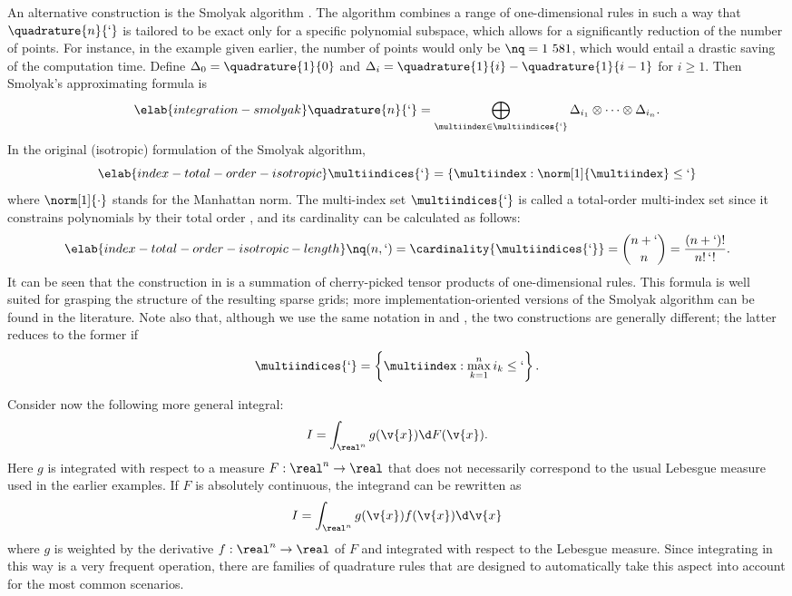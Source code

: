 An alternative construction is the Smolyak algorithm \cite{eldred2008,
heiss2008, maitre2010}. The algorithm combines a range of one-dimensional rules
in such a way that $\quadrature{n}{\lq}$ is tailored to be exact only for a
specific polynomial subspace, which allows for a significantly reduction of the
number of points. For instance, in the example given earlier, the number of
points would only be $\nq = 1~581$, which would entail a drastic saving of the
computation time. Define $\Delta_0 = \quadrature{1}{0}$ and $\Delta_i =
\quadrature{1}{i} - \quadrature{1}{i - 1}$ for $i \geq 1$. Then Smolyak's
approximating formula is
\begin{equation} \elab{integration-smolyak}
  \quadrature{n}{\lq} = \bigoplus_{\multiindex \in \multiindices{\lq}} \Delta_{i_1} \otimes \cdots \otimes \Delta_{i_n}.
\end{equation}
In the original (isotropic) formulation of the Smolyak algorithm,
\begin{equation} \elab{index-total-order-isotropic}
  \multiindices{\lq} = \left\{ \multiindex: \norm[1]{\multiindex} \leq \lq \right\}
\end{equation}
where $\norm[1]{\cdot}$ stands for the Manhattan norm. The multi-index set
$\multiindices{\lq}$ is called a total-order multi-index set since it constrains
polynomials by their total order \cite{eldred2008, beck2011}, and its
cardinality can be calculated as follows:
\begin{equation} \elab{index-total-order-isotropic-length}
  \nq(n, \lq) = \cardinality{\multiindices{\lq}} = {n + \lq \choose n} = \frac{(n + \lq)!}{n! \, \lq!}.
\end{equation}
It can be seen that the construction in  is a
summation of cherry-picked tensor products of one-dimensional rules. This
formula is well suited for grasping the structure of the resulting sparse grids;
more implementation-oriented versions of the Smolyak algorithm can be found in
the literature. Note also that, although we use the same notation in
 and , the two constructions
are generally different; the latter reduces to the former if
\[
  \multiindices{\lq} = \left\{ \multiindex: \max_{k = 1}^n i_k \leq \lq \right\}.
\]

Consider now the following more general integral:
\[
  I = \int_{\real^n} g(\v{x}) \d F(\v{x}).
\]
Here $g$ is integrated with respect to a measure $F: \real^n \to \real$
\cite{durrett2010} that does not necessarily correspond to the usual Lebesgue
measure used in the earlier examples. If $F$ is absolutely continuous, the
integrand can be rewritten as
\[
  I = \int_{\real^n} g(\v{x}) f(\v{x}) \d \v{x}
\]
where $g$ is weighted by the derivative $f: \real^n \to \real$ of $F$ and
integrated with respect to the Lebesgue measure. Since integrating in this way
is a very frequent operation, there are families of quadrature rules that are
designed to automatically take this aspect into account for the most common
scenarios.

